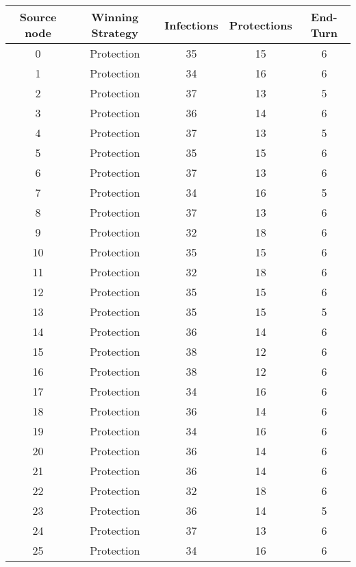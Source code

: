 \documentclass[results.tex]{subfiles}
\begin{document}
\begin{center}
  \begin{tabular}{| c || c | c | c | c |}
    \hline
    {\bfseries Source node} & {\bfseries Winning Strategy} & {\bfseries Infections} & {\bfseries Protections} & {\bfseries End-Turn} \\  %
    \hline\hline
    0 & Protection & 35 & 15 & 6 \\ 
    \hline
    1 & Protection & 34 & 16 & 6 \\ 
    \hline
    2 & Protection & 37 & 13 & 5 \\ 
    \hline
    3 & Protection & 36 & 14 & 6 \\ 
    \hline
    4 & Protection & 37 & 13 & 5 \\ 
    \hline
    5 & Protection & 35 & 15 & 6 \\ 
    \hline
    6 & Protection & 37 & 13 & 6 \\ 
    \hline
    7 & Protection & 34 & 16 & 5 \\ 
    \hline
    8 & Protection & 37 & 13 & 6 \\ 
    \hline
    9 & Protection & 32 & 18 & 6 \\ 
    \hline
    10 & Protection & 35 & 15 & 6 \\ 
    \hline
    11 & Protection & 32 & 18 & 6 \\ 
    \hline
    12 & Protection & 35 & 15 & 6 \\ 
    \hline
    13 & Protection & 35 & 15 & 5 \\ 
    \hline
    14 & Protection & 36 & 14 & 6 \\ 
    \hline
    15 & Protection & 38 & 12 & 6 \\ 
    \hline
    16 & Protection & 38 & 12 & 6 \\ 
    \hline
    17 & Protection & 34 & 16 & 6 \\ 
    \hline
    18 & Protection & 36 & 14 & 6 \\ 
    \hline
    19 & Protection & 34 & 16 & 6 \\ 
    \hline
    20 & Protection & 36 & 14 & 6 \\ 
    \hline
    21 & Protection & 36 & 14 & 6 \\ 
    \hline
    22 & Protection & 32 & 18 & 6 \\ 
    \hline
    23 & Protection & 36 & 14 & 5 \\ 
    \hline
    24 & Protection & 37 & 13 & 6 \\ 
    \hline
    25 & Protection & 34 & 16 & 6 \\ 

\end{tabular}
\end{center}
\end{document}
